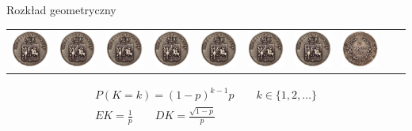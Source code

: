 \documentclass{mp}
\begin{document}
\begin{frame}{Rozkład geometryczny}
\tabcolsep=0cm
\begin{tabular}{cccccccccc}
\includegraphics[width=.1\textwidth]{head.jpg} &
\includegraphics[width=.1\textwidth]{head.jpg} &
\includegraphics[width=.1\textwidth]{head.jpg} &
\includegraphics[width=.1\textwidth]{head.jpg} &
\includegraphics[width=.1\textwidth]{head.jpg} &
\includegraphics[width=.1\textwidth]{head.jpg} &
\includegraphics[width=.1\textwidth]{head.jpg} &
\includegraphics[width=.1\textwidth]{tail.jpg} &
\end{tabular}
\begin{gather*}
P(K=k)=(1-p)^{k-1}p \qquad k\in\{1,2,\ldots\} \\
EK=\frac{1}{p} \qquad DK=\frac{\sqrt{1-p}}{p}
\end{gather*}
\end{frame}
\end{document}
